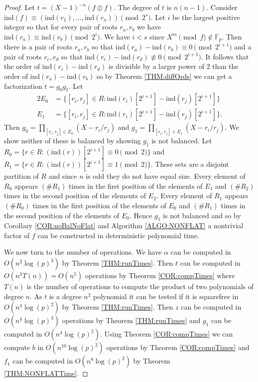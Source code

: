 \documentclass{article}
\theoremstyle{plain}
\theoremstyle{definition}
\def\Fp {{ \mathbb{F} _ {p} }}
\def\ind {{ \mathrm{ind} }}
\begin{document}
    \begin{proof}
					
				Let $t=(X-1)^{-n}(f \oslash f)$. The degree of $t$ is $n(n-1)$. Consider $\ind(f) \equiv (\ind(r_1),\ldots,\ind(r_n)) \pmod{2^s}$. Let $i$ be the largest positive integer so that for every pair of roots $r_a,r_b$ we have $\ind(r_a) \equiv \ind(r_b) \pmod {2^i}$. We have $i<s$ since $X^m \pmod f \not\in \Fp$. Then there is a pair of roots $r_a,r_b$ so that $\ind(r_a) - \ind(r_b) \equiv 0 \pmod {2^{i+1}}$ and a pair of roots $r_c,r_d$ so that $\ind(r_c) - \ind(r_d) \not\equiv 0 \pmod 2^{i+1}$. It follows that the order of $\ind(r_c) - \ind(r_d)$ is divisible by a larger power of 2 than the order of $\ind(r_a) - \ind(r_b)$ so by Theorem \ref{THM:diffOrds} we can get a factorization $t=g_0g_1$. Let 			
				\begin{alignat*}{2}
				    E_0 &= \{ [r_i,r_j] \in R : \ind(r_i)[2^{i+1}] - \ind(r_j)[2^{i+1}] \} \\
					  E_1 &= \{ [r_i,r_j] \in R : \ind(r_i)[2^{i+1}] - \ind(r_j)[2^{i+1}] \}.
				\end{alignat*}
				\noindent Then $g_0=\prod_{[r_i,r_j] \in E_0}{(X-r_i/r_j)}$ and $g_1=\prod_{[r_i,r_j] \in E_1}{(X-r_i/r_j)}$. We show neither of these is balanced by showing $g_1$ is not balanced. Let $R_0 = \{ r \in R : (\ind(r))[2^{i+1}] \equiv 0 \pmod 2 \}$ and $R_1 = \{ r \in R : (\ind(r))[2^{i+1}] \equiv 1 \pmod 2 \}$. These sets are a disjoint partition of $R$ and since $n$ is odd they do not have equal size. Every element of $R_0$ appears $(\#R_1)$ times in the first position of the elements of $E_1$ and $(\#R_2)$ times in the second position of the elements of $E_2$. Every element of $R_1$ appears $(\#R_0)$ times in the first position of the elements of $E_0$ and $(\#R_1)$ times in the second position of the elements of $E_0$. Hence $g_1$ is not balanced and so by Corollary \ref{COR:noBalNoFlat} and Algorithm \ref{ALGO:NONFLAT} a nontrivial factor of $f$ can be constructed in deterministic polynomial time.
				
				We now turn to the number of operations. We have $\alpha$ can be computed in $O(n^2\log(p)^3)$ by Theorem \ref{THM:runTimes}. Then $t$ can be computed in $O(n^3 T(n))=O(n^5)$ operations by Theorem \ref{COR:compTimes} where $T(n)$ is the number of operations to compute the product of two polynomials of degree $n$. As $t$ is a degree $n^2$ polynomial it can be tested if it is squarefree in $O(n^4\log(p)^2)$ by Theorem \ref{THM:runTimes}. Then $z$ can be computed in $O(n^4\log(p)^3)$ operations by Theorem \ref{THM:runTimes} and $g_1$ can be computed in $O(n^4\log(p)^2)$. Using Theorem \ref{COR:compTimes} we can compute $b$ in $O(n^{10}\log(p)^2)$ operations by Theorem \ref{COR:compTimes} and $f_1$ can be computed in $O(n^8\log(p)^2)$ by Theorem \ref{THM:NONFLATTime}.
				
		\end{proof}
		
\end{document}
